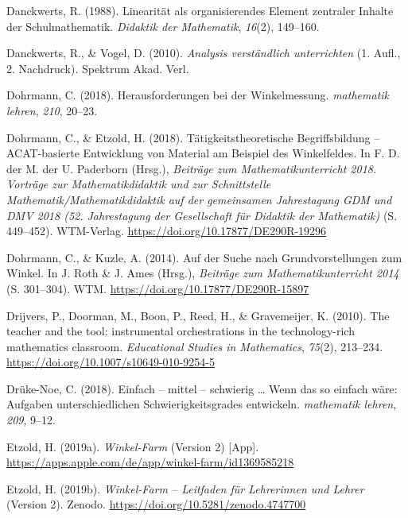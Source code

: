 \documentclass[
]{scrbook}
\newlength{\cslhangindent}
\newlength{\cslentryspacingunit} %
\newenvironment{CSLReferences}[2] %
 {%
  \setlength{\parindent}{0pt}
  \ifodd #1
  \let\oldpar\par
  \def\par{\hangindent=\cslhangindent\oldpar}
  \fi
  \setlength{\parskip}{#2\cslentryspacingunit}
 }%
 {}
\theoremstyle{definition}
\theoremstyle{definition}
\theoremstyle{definition}
\theoremstyle{definition}
\theoremstyle{remark}
\begin{document}
\begin{CSLReferences}{1}{0}
\leavevmode{}%
Danckwerts, R. (1988). Linearität als organisierendes Element zentraler Inhalte der Schulmathematik. \emph{Didaktik der Mathematik}, \emph{16}(2), 149--160.

\leavevmode{}%
Danckwerts, R., \& Vogel, D. (2010). \emph{Analysis verständlich unterrichten} (1. Aufl., 2. Nachdruck). Spektrum Akad. Verl.

\leavevmode{}%
Dohrmann, C. (2018). Herausforderungen bei der {Winkelmessung}. \emph{mathematik lehren}, \emph{210}, 20--23.

\leavevmode{}%
Dohrmann, C., \& Etzold, H. (2018). Tätigkeitstheoretische {Begriffsbildung} -- {ACAT}-basierte {Entwicklung} von {Material} am {Beispiel} des {Winkelfeldes}. In F. D. der M. der U. Paderborn (Hrsg.), \emph{Beiträge zum {Mathematikunterricht} 2018. {Vorträge} zur {Mathematikdidaktik} und zur {Schnittstelle} {Mathematik}/{Mathematikdidaktik} auf der gemeinsamen {Jahrestagung} {GDM} und {DMV} 2018 (52. {Jahrestagung} der {Gesellschaft} für {Didaktik} der {Mathematik})} (S. 449--452). WTM-Verlag. \url{https://doi.org/10.17877/DE290R-19296}

\leavevmode{}%
Dohrmann, C., \& Kuzle, A. (2014). Auf der {Suche} nach {Grundvorstellungen} zum {Winkel}. In J. Roth \& J. Ames (Hrsg.), \emph{Beiträge zum {Mathematikunterricht} 2014} (S. 301--304). WTM. \url{https://doi.org/10.17877/DE290R-15897}

\leavevmode{}%
Drijvers, P., Doorman, M., Boon, P., Reed, H., \& Gravemeijer, K. (2010). The teacher and the tool: instrumental orchestrations in the technology-rich mathematics classroom. \emph{Educational Studies in Mathematics}, \emph{75}(2), 213--234. \url{https://doi.org/10.1007/s10649-010-9254-5}

\leavevmode{}%
Drüke-Noe, C. (2018). Einfach -- mittel -- schwierig \ldots{} {Wenn} das so einfach wäre: {Aufgaben} unterschiedlichen {Schwierigkeitsgrades} entwickeln. \emph{mathematik lehren}, \emph{209}, 9--12.

\leavevmode{}%
Etzold, H. (2019a). \emph{Winkel-{Farm}} (Version 2) {[}App{]}. \url{https://apps.apple.com/de/app/winkel-farm/id1369585218}

\leavevmode{}%
Etzold, H. (2019b). \emph{Winkel-{Farm} -- {Leitfaden} für {Lehrerinnen} und {Lehrer}} (Version 2). Zenodo. \url{https://doi.org/10.5281/zenodo.4747700}


\end{CSLReferences}
\end{document}
